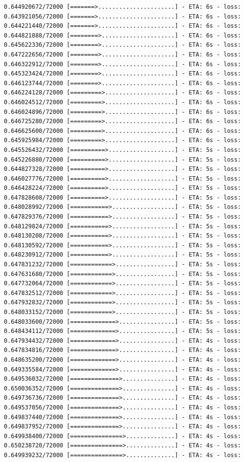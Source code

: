 \documentclass[12pt,fleqn]{article}\usepackage{../../common}
\begin{document}
\begin{verbatim}
0.644920672/72000 [=======>......................] - ETA: 6s - loss: 0.643921056/72000 [=======>......................] - ETA: 6s - loss: 0.644221440/72000 [=======>......................] - ETA: 6s - loss: 0.644821888/72000 [========>.....................] - ETA: 6s - loss: 0.645622336/72000 [========>.....................] - ETA: 6s - loss: 0.647222656/72000 [========>.....................] - ETA: 6s - loss: 0.646322912/72000 [========>.....................] - ETA: 6s - loss: 0.645323424/72000 [========>.....................] - ETA: 6s - loss: 0.646123744/72000 [========>.....................] - ETA: 6s - loss: 0.646224128/72000 [=========>....................] - ETA: 6s - loss: 0.646024512/72000 [=========>....................] - ETA: 6s - loss: 0.646024896/72000 [=========>....................] - ETA: 6s - loss: 0.646725280/72000 [=========>....................] - ETA: 6s - loss: 0.646625600/72000 [=========>....................] - ETA: 6s - loss: 0.645925984/72000 [=========>....................] - ETA: 6s - loss: 0.645526432/72000 [==========>...................] - ETA: 5s - loss: 0.645226880/72000 [==========>...................] - ETA: 5s - loss: 0.644827328/72000 [==========>...................] - ETA: 5s - loss: 0.646027776/72000 [==========>...................] - ETA: 5s - loss: 0.646428224/72000 [==========>...................] - ETA: 5s - loss: 0.647828608/72000 [==========>...................] - ETA: 5s - loss: 0.648028992/72000 [===========>..................] - ETA: 5s - loss: 0.647829376/72000 [===========>..................] - ETA: 5s - loss: 0.648129824/72000 [===========>..................] - ETA: 5s - loss: 0.648130208/72000 [===========>..................] - ETA: 5s - loss: 0.648130592/72000 [===========>..................] - ETA: 5s - loss: 0.648230912/72000 [===========>..................] - ETA: 5s - loss: 0.647831232/72000 [============>.................] - ETA: 5s - loss: 0.647631680/72000 [============>.................] - ETA: 5s - loss: 0.647732064/72000 [============>.................] - ETA: 5s - loss: 0.647832512/72000 [============>.................] - ETA: 5s - loss: 0.647932832/72000 [============>.................] - ETA: 5s - loss: 0.648033152/72000 [============>.................] - ETA: 5s - loss: 0.648033600/72000 [=============>................] - ETA: 5s - loss: 0.648434112/72000 [=============>................] - ETA: 5s - loss: 0.647934432/72000 [=============>................] - ETA: 4s - loss: 0.647834816/72000 [=============>................] - ETA: 4s - loss: 0.648635200/72000 [=============>................] - ETA: 4s - loss: 0.649335584/72000 [=============>................] - ETA: 4s - loss: 0.649536032/72000 [==============>...............] - ETA: 4s - loss: 0.650036352/72000 [==============>...............] - ETA: 4s - loss: 0.649736736/72000 [==============>...............] - ETA: 4s - loss: 0.649537056/72000 [==============>...............] - ETA: 4s - loss: 0.649837440/72000 [==============>...............] - ETA: 4s - loss: 0.649837952/72000 [==============>...............] - ETA: 4s - loss: 0.649938400/72000 [===============>..............] - ETA: 4s - loss: 0.650238720/72000 [===============>..............] - ETA: 4s - loss: 0.649939232/72000 [===============>..............] - ETA: 4s - loss: 
\end{verbatim}
\end{document}
